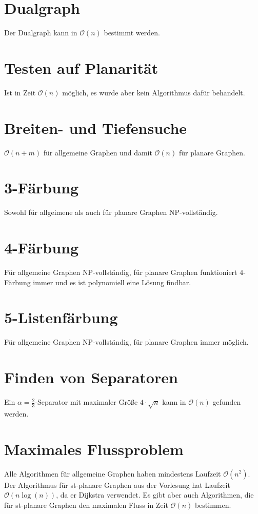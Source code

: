 \documentclass[a4paper,11pt]{report}
\begin{document}
\section{Dualgraph}
Der Dualgraph kann in $\mathcal{O}(n)$ bestimmt werden.


\section{Testen auf Planarität}
Ist in Zeit $\mathcal{O}(n)$ möglich, es wurde aber kein Algorithmus dafür behandelt.


\section{Breiten- und Tiefensuche}
$\mathcal{O}(n+m)$ für allgemeine Graphen und damit $\mathcal{O}(n)$ für planare Graphen.


\section{3-Färbung}
Sowohl für allgeimene als auch für planare Graphen NP-vollständig.


\section{4-Färbung}
Für allgemeine Graphen NP-vollständig, für planare Graphen funktioniert 4-Färbung immer und es ist polynomiell eine Lösung findbar.


\section{5-Listenfärbung}
Für allgemeine Graphen NP-vollständig, für planare Graphen immer möglich.


\section{Finden von Separatoren}
Ein $\alpha = \frac{2}{3}$-Separator mit maximaler Größe $4 \cdot \sqrt{n}$ kann in $\mathcal{O}(n)$ gefunden werden.


\section{Maximales Flussproblem}
Alle Algorithmen für allgemeine Graphen haben mindestens Laufzeit $\mathcal{O}(n^2)$. Der Algorithmus für st-planare Graphen aus der Vorlesung hat Laufzeit $\mathcal{O}(n \log(n))$, da er Dijkstra verwendet. Es gibt aber auch Algorithmen, die für st-planare Graphen den maximalen Fluss in Zeit $\mathcal{O}(n)$ bestimmen.
\end{document}
